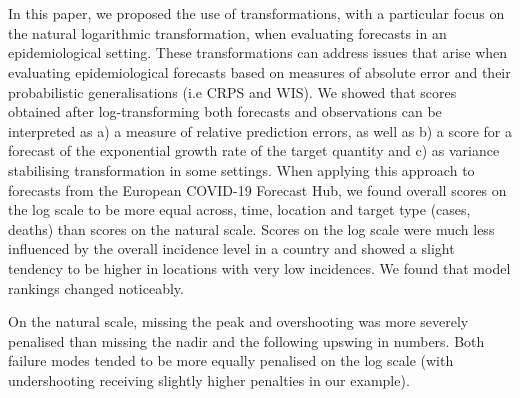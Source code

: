 \documentclass[10pt,letterpaper]{article} %
\providecommand{\DIFaddtex}[1]{{\protect\color{blue}\uwave{#1}}} %
\providecommand{\DIFaddend}{} %
\providecommand{\DIFadd}[1]{\texorpdfstring{\DIFaddtex{#1}}{#1}} %
\DeclareRobustCommand{\DIFaddend}{\DIFOaddend \let\includegraphics\DIFOincludegraphics} %
\begin{document}
\section*{\DIFadd{Discussion}}
\DIFaddend \label{sec:discussion}

In this paper, we proposed the use of transformations, with a particular focus on the natural logarithmic transformation, when evaluating forecasts in an epidemiological setting. These transformations can address issues that arise when evaluating epidemiological forecasts based on measures of absolute error and their probabilistic generalisations (i.e CRPS and WIS). We showed that scores obtained after log-transforming both forecasts and observations can be interpreted as a) a measure of relative prediction errors, as well as b) a score for a forecast of the exponential growth rate of the target quantity and c) as variance stabilising transformation in some settings.
When applying this approach to forecasts from the European COVID-19 Forecast Hub, we found overall scores on the log scale to be more equal across, time, location and target type (cases, deaths) than scores on the natural scale. Scores on the log scale were much less influenced by the overall incidence level in a country and showed a slight tendency to be higher in locations with very low incidences. We found that model rankings changed noticeably. 

On the natural scale, missing the peak and overshooting was more severely penalised than missing the nadir and the following upswing in numbers. Both failure modes tended to be more equally penalised on the log scale (with undershooting receiving slightly higher penalties in our example). 
\end{document}
